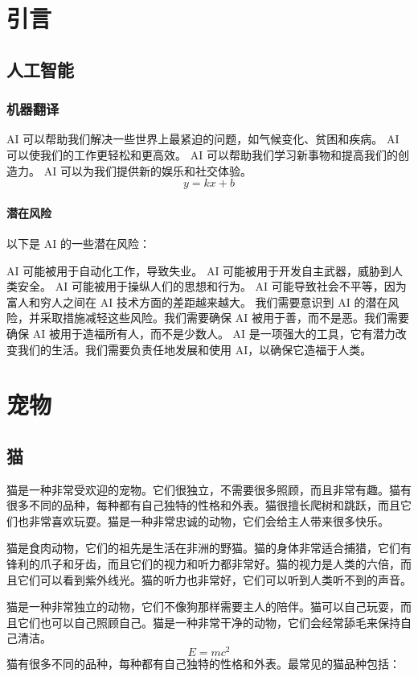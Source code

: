 \documentclass[engineeringmaster]{hquThesis}
\begin{document}


\chapter{引言}
\section{人工智能}
\subsection{机器翻译}
AI 可以帮助我们解决一些世界上最紧迫的问题，如气候变化、贫困和疾病。
AI 可以使我们的工作更轻松和更高效。
AI 可以帮助我们学习新事物和提高我们的创造力。
AI 可以为我们提供新的娱乐和社交体验。
\begin{equation}
y = kx + b
\end{equation}
\subsubsection{潜在风险}
以下是 AI 的一些潜在风险：

AI 可能被用于自动化工作，导致失业。
AI 可能被用于开发自主武器，威胁到人类安全。
AI 可能被用于操纵人们的思想和行为。
AI 可能导致社会不平等，因为富人和穷人之间在 AI 技术方面的差距越来越大。
我们需要意识到 AI 的潜在风险，并采取措施减轻这些风险。我们需要确保 AI 被用于善，而不是恶。我们需要确保 AI 被用于造福所有人，而不是少数人。
AI 是一项强大的工具，它有潜力改变我们的生活。我们需要负责任地发展和使用 AI，以确保它造福于人类。

\chapter{宠物}
\section{猫}
猫是一种非常受欢迎的宠物。它们很独立，不需要很多照顾，而且非常有趣。猫有很多不同的品种，每种都有自己独特的性格和外表。猫很擅长爬树和跳跃，而且它们也非常喜欢玩耍。猫是一种非常忠诚的动物，它们会给主人带来很多快乐。

猫是食肉动物，它们的祖先是生活在非洲的野猫。猫的身体非常适合捕猎，它们有锋利的爪子和牙齿，而且它们的视力和听力都非常好。猫的视力是人类的六倍，而且它们可以看到紫外线光。猫的听力也非常好，它们可以听到人类听不到的声音。

猫是一种非常独立的动物，它们不像狗那样需要主人的陪伴。猫可以自己玩耍，而且它们也可以自己照顾自己。猫是一种非常干净的动物，它们会经常舔毛来保持自己清洁。
\begin{equation}
E = mc^2
\end{equation}
猫有很多不同的品种，每种都有自己独特的性格和外表。最常见的猫品种包括：
\end{document}
